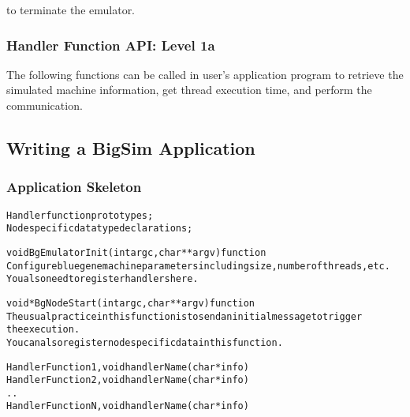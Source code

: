 
to terminate the emulator.

\subsubsection{Handler Function API: Level 1a}

The following functions can be called in user's application program to retrieve
the simulated machine information, get thread execution time, and perform the
communication.








\subsection{Writing a BigSim Application}

\subsubsection{Application Skeleton}

\begin{alltt}
Handler function prototypes;
Node specific data type declarations;

void  BgEmulatorInit(int argc, char **argv)  function
  Configure bluegene machine parameters including size, number of threads, etc.
  You also need to register handlers here.

void *BgNodeStart(int argc, char **argv) function
  The usual practice in this function is to send an initial message to trigger 
  the execution.
  You can also register node specific data in this function.

Handler Function 1, void handlerName(char *info)
Handler Function 2, void handlerName(char *info)
..
Handler Function N, void handlerName(char *info)

\end{alltt}

